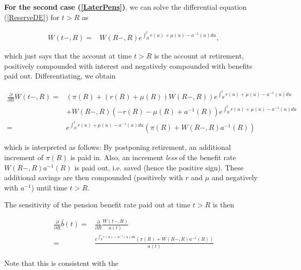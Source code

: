 \documentclass{article}
\newcommand{\1}[1]{\mathbbm{1}_{\left\lbrace #1 \right\rbrace}}
\theoremstyle{break}
\theoremstyle{remark}
\numberwithin{equation}{section}
\begin{document}
\textbf{For the second case (\ref{LaterPens})}, we can solve the differential equation (\ref{ReserveDE}) for $t>R$ as

\begin{align} \label{ReserveAfterRetirement}
	W(t-,R) =& W(R-,R) e^{\int_R^t r(u) + \mu(u) - a^{-1}(u) du},
\end{align}

which just says that the account at time $t>R$ is the account at retirement, positively compounded with interest and negatively compounded with benefits paid out. Differentiating, we obtain

\begin{align*}
	\frac{\partial}{\partial R} W(t-,R) =& \left( \pi(R) + \left(r(R) + \mu(R)\right) W(R-,R) \right) e^{\int_R^t r(u) + \mu(u) - a^{-1}(u) du} \\
	&+ W(R-,R) \left( - r(R) - \mu(R) + a^{-1}(R) \right) e^{\int_R^t r(u) + \mu(u) - a^{-1}(u) du} \\
	=& e^{\int_R^t r(u) + \mu(u) - a^{-1}(u) du} \left( \pi (R) + W(R-,R) a^{-1}(R) \right)
\end{align*}

which is interpreted as follows: By postponing retirement, an additional increment of $\pi(R)$ is paid in. Also, an increment \textit{less} of the benefit rate $W(R-,R) a^{-1}(R)$ is paid out, i.e. saved (hence the positive sign). These additional savings are then compounded (positively with $r$ and $\mu$ and negatively with $a^{-1}$) until time $t>R$.

The sensitivity of the pension benefit rate paid out at time $t>R$ is then

\begin{align*}
	\frac{\partial}{\partial R} \hat{b}(t) =& \frac{\partial}{\partial R} \frac{W(t-,R)}{a(t)} \\ =& \frac{e^{\int_R^t r(u) - a^{-1}(u) du} \left( \pi (R) + W(R-,R) a^{-1}(R) \right)}{a(t)}
\end{align*}

Note that this is consistent with the 
\end{document}
